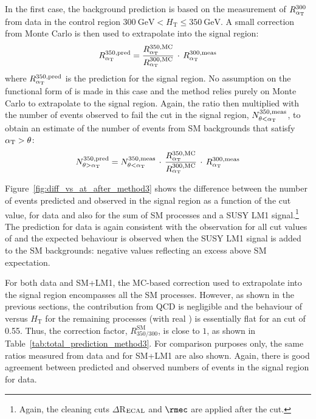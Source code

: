 In the first case, the background prediction is based on the measurement of
$R_{\alpha_{\mathrm{T}}}^{300}$ from data in the control region $300~\mathrm{GeV} <
H_{\mathrm{T}} \leq 350~\mathrm{GeV}$. A small correction from Monte
Carlo is then used to extrapolate into the signal region:
\begin{equation}
  R_{\alpha_{\mathrm{T}}}^{350,\mathrm{pred}} =
  \frac{R_{\alpha_{\mathrm{T}}}^{350,\mathrm{MC}}}{R_{\alpha_{\mathrm{T}}}^{300,\mathrm{MC}}} 
  \,\cdot\, 
  R_{\alpha_{\mathrm{T}}}^{300,\mathrm{meas}} 
\end{equation}
where $R_{\alpha_{\mathrm{T}}}^{350,\mathrm{pred}}$ is the prediction for the signal
region. No assumption on the functional form of \RaT is made in this
case and the method relies purely on Monte Carlo to extrapolate to the
signal region. Again, the ratio then multiplied with the number of
events observed to fail the \aT cut in the signal region,
$N_{\theta<\alpha_{\mathrm{T}}}^{350,\mathrm{meas}}$, to obtain an estimate of the
number of events from SM backgrounds that satisfy $\alpha_{\mathrm{T}} > \theta$:
\begin{equation}
  N_{\theta>\alpha_{\mathrm{T}}}^{350,\mathrm{pred}} = 
  N_{\theta<\alpha_{\mathrm{T}}}^{350,\mathrm{meas}}
  \,\cdot\, 
  \frac{R_{\alpha_{\mathrm{T}}}^{350,\mathrm{MC}}}{R_{\alpha_{\mathrm{T}}}^{300,\mathrm{MC}}} 
  \,\cdot\, 
  R_{\alpha_{\mathrm{T}}}^{300,\mathrm{meas}}
\end{equation}

Figure~\ref{fig:diff_vs_at_after_method3} shows the difference between
the number of events predicted and observed in the signal region as a
function of the \aT cut value, for data and also for the sum of SM
processes and a SUSY LM1 signal.\footnote{Again, the cleaning cuts
  $\Delta$R$_{\rm ECAL}$ and $\rmec$ are applied after the \aT cut.}
The prediction for data is again consistent with the observation for
all cut values of \aT and the expected behaviour is observed when the
SUSY LM1 signal is added to the SM backgrounds: negative values
reflecting an excess above SM expectation.

For both data and SM+LM1, the MC-based correction used to extrapolate
into the signal region encompasses all the SM processes. However, as
shown in the previous sections, the contribution from QCD is
negligible and the behaviour of \RaT versus $H_{\mathrm{T}}$ for the
remaining processes (with real \mymet) is essentially flat for an \aT
cut of 0.55. Thus, the correction factor, $R^{\mathrm{SM}}_{350/300}$,
is close to $1$, as shown in
Table~\ref{tab:total_prediction_method3}. For comparison purposes
only, the same ratios measured from data and for SM+LM1 are also
shown. Again, there is good agreement between predicted and observed
numbers of events in the signal region for data.


